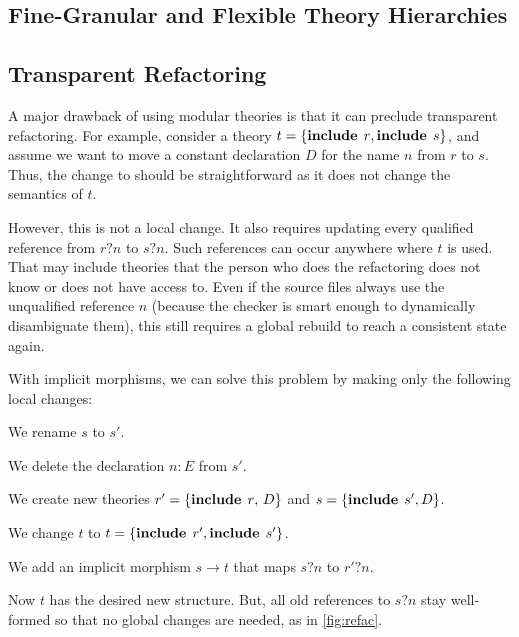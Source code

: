 \subsection{Fine-Granular and Flexible Theory Hierarchies}


\subsection{Transparent Refactoring}

A major drawback of using modular theories is that it can preclude transparent refactoring.
For example, consider a theory $t=\{\operatorname{\mathbf{include}}{\;r},\operatorname{\mathbf{include}}{\;s}\}$, and assume we want to move a constant declaration $D$ for the name $n$ from $r$ to $s$.
Thus, the change to should be straightforward as it does not change the semantics of $t$.

However, this is not a local change.
It also requires updating every qualified reference from $r?n$ to $s?n$.
Such references can occur anywhere where $t$ is used.
That may include theories that the person who does the refactoring does not know or does not have access to.
Even if the source files always use the unqualified reference $n$ (because the checker is smart enough to dynamically disambiguate them), this still requires a global rebuild to reach a consistent state again.

With implicit morphisms, we can solve this problem by making only the following local changes:
\begin{compactenum}
  \item We rename $s$ to $s'$.
  \item We delete the declaration $n:E$ from $s'$.
  \item We create new theories $r'=\{\operatorname{\mathbf{include}}{\;r},\,D\}$ and $s=\{\operatorname{\mathbf{include}}{\;s'},D\}$.
  \item We change $t$ to $t=\{\operatorname{\mathbf{include}}{\;r'},\operatorname{\mathbf{include}}{\;s'}\}$.
  \item We add an implicit morphism $s\to t$ that maps $s?n$ to $r'?n$.
\end{compactenum}
Now $t$ has the desired new structure.
But, all old references to $s?n$ stay well-formed so that no global changes are needed, as in \autoref{fig:refac}.

